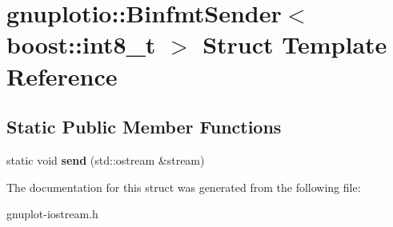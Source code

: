 \hypertarget{structgnuplotio_1_1BinfmtSender_3_01boost_1_1int8__t_01_4}{}\section{gnuplotio\+:\+:Binfmt\+Sender$<$ boost\+:\+:int8\+\_\+t $>$ Struct Template Reference}
\label{structgnuplotio_1_1BinfmtSender_3_01boost_1_1int8__t_01_4}
\subsection*{Static Public Member Functions}
\begin{DoxyCompactItemize}
\item 
\mbox{\label{structgnuplotio_1_1BinfmtSender_3_01boost_1_1int8__t_01_4_a6f61d43b0da25f044bfad0d45fe888b4}} 
static void {\bfseries send} (std\+::ostream \&stream)
\end{DoxyCompactItemize}


The documentation for this struct was generated from the following file\+:\begin{DoxyCompactItemize}
\item 
gnuplot-\/iostream.\+h\end{DoxyCompactItemize}
